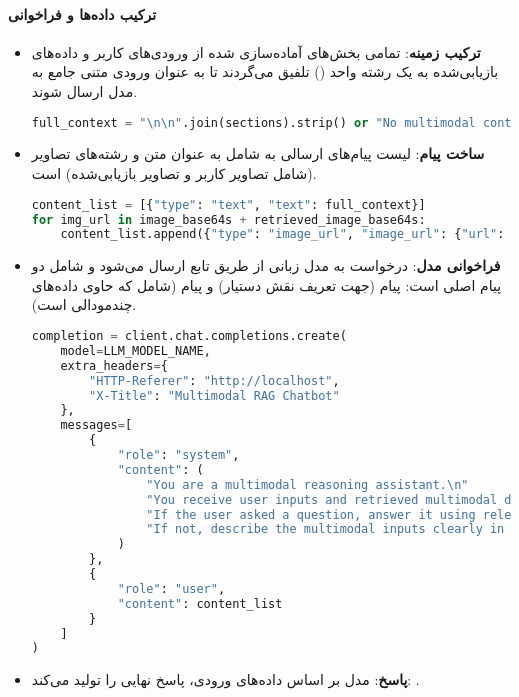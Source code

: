 \documentclass{article}
\begin{document}
\paragraph{ترکیب داده‌ها و فراخوانی }
\begin{itemize}
    \item \textbf{ترکیب زمینه}: تمامی بخش‌های آماده‌سازی شده از ورودی‌های کاربر و داده‌های بازیابی‌شده به یک رشته واحد () تلفیق می‌گردند تا به عنوان ورودی متنی جامع به مدل ارسال شوند.
    
    \begin{latin}
    \begin{lstlisting}[language=Python]
full_context = "\n\n".join(sections).strip() or "No multimodal content provided."
    \end{lstlisting}
    \end{latin}
    
    \item \textbf{ساخت پیام}: لیست پیام‌های ارسالی به  شامل  به عنوان متن و رشته‌های  تصاویر (شامل تصاویر کاربر و تصاویر بازیابی‌شده) است.
    
    \begin{latin}
    \begin{lstlisting}[language=Python]
content_list = [{"type": "text", "text": full_context}]
for img_url in image_base64s + retrieved_image_base64s:
    content_list.append({"type": "image_url", "image_url": {"url": img_url}})
    \end{lstlisting}
    \end{latin}
    
    \item \textbf{فراخوانی مدل}: درخواست به مدل زبانی از طریق تابع  ارسال می‌شود و شامل دو پیام اصلی است: پیام  (جهت تعریف نقش دستیار) و پیام  (شامل  که حاوی داده‌های چندمودالی است).
    
    \begin{latin}
    \begin{lstlisting}[language=Python]
completion = client.chat.completions.create(
    model=LLM_MODEL_NAME, 
    extra_headers={
        "HTTP-Referer": "http://localhost",
        "X-Title": "Multimodal RAG Chatbot"
    },
    messages=[
        {
            "role": "system",
            "content": (
                "You are a multimodal reasoning assistant.\n"
                "You receive user inputs and retrieved multimodal data (text, image, audio).\n"
                "If the user asked a question, answer it using relevant data.\n"
                "If not, describe the multimodal inputs clearly in Markdown."
            )
        },
        {
            "role": "user",
            "content": content_list
        }
    ]
)
    \end{lstlisting}
    \end{latin}
    
    \item \textbf{پاسخ}: مدل بر اساس داده‌های ورودی، پاسخ نهایی را تولید می‌کند: .
\end{itemize}
\end{document}

